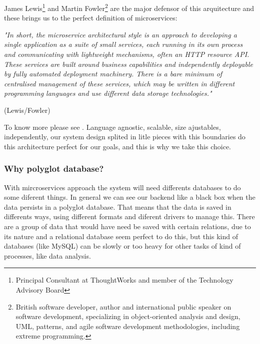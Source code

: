 \noindent James Lewis\footnote{Principal Consultant at ThoughtWorks and
member of the Technology Advisory Board} and Martin Fowler\footnote{British software developer,
author and international public speaker on software development, specializing in
object-oriented analysis and design, UML, patterns, and agile software development
methodologies, including extreme programming.} are the major defensor of this
arquitecture and these brings us to the perfect definition of microservices:
\bigskip

\begin{minipage}{0.9\linewidth}
        \vspace{5pt}
        {\small
        \textit{"In short, the microservice architectural style is an approach to developing a
        single application as a suite of small services, each running in its own process
        and communicating with lightweight mechanisms, often an HTTP resource API.
        These services are built around business capabilities and independently deployable
        by fully automated deployment machinery. There is a bare minimum of centralised management
        of these services, which may be written in different programming languages and
        use different data storage technologies."}
        }
        \begin{flushright}
            (Lewis/Fowler)
        \end{flushright}
        \vspace{5pt}
    \end{minipage}

To know more please see \cite{Fowler14Micro}.
\intro
Language agnostic, scalable, size ajustables, independently, our system design
splited in litle pieces with this boundaries do this architecture perfect for
our goals, and this is why we take this choice.

\subsubsection{Why polyglot database?}

With mircroservices approach the system will need differents databases to do
some diferent things. In general we can see our
backend like a black box when the data persists in a polyglot database.
That means that the data is saved in differents ways, using different
formats and diferent drivers to manage this. There are a group of
data that would have need be saved with certain relations, due to its nature
and a relational database seem perfect to do this, but this kind of
databases (like MySQL) can be slowly or too heavy for other tasks
of kind of processes, like data analysis.


